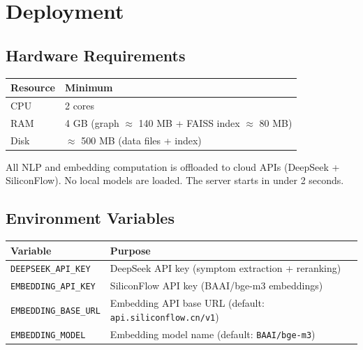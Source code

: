 \documentclass[11pt,a4paper]{article}
\begin{document}
\newpage

\section{Deployment}

\subsection{Hardware Requirements}

\begin{table}[H]
\centering
\begin{tabular}{@{}ll@{}}
\toprule
\textbf{Resource} & \textbf{Minimum} \\
\midrule
CPU & 2 cores \\
RAM & 4 GB (graph $\approx$ 140 MB + FAISS index $\approx$ 80 MB) \\
Disk & $\approx$ 500 MB (data files + index) \\
\bottomrule
\end{tabular}
\end{table}

All NLP and embedding computation is offloaded to cloud APIs (DeepSeek + SiliconFlow). No local models are loaded. The server starts in under 2 seconds.

\subsection{Environment Variables}

\begin{table}[H]
\centering
\begin{tabular}{@{}ll@{}}
\toprule
\textbf{Variable} & \textbf{Purpose} \\
\midrule
\texttt{DEEPSEEK\_API\_KEY} & DeepSeek API key (symptom extraction + reranking) \\
\texttt{EMBEDDING\_API\_KEY} & SiliconFlow API key (BAAI/bge-m3 embeddings) \\
\texttt{EMBEDDING\_BASE\_URL} & Embedding API base URL (default: \texttt{api.siliconflow.cn/v1}) \\
\texttt{EMBEDDING\_MODEL} & Embedding model name (default: \texttt{BAAI/bge-m3}) \\
\bottomrule
\end{tabular}
\end{table}
\end{document}

